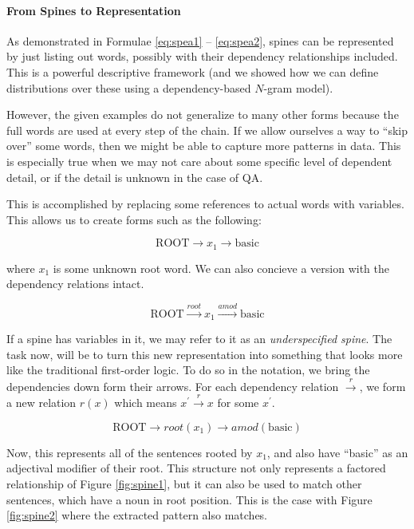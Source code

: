 \documentclass[twoside]{article}
\begin{document}
\paragraph{From Spines to Representation}

As demonstrated in Formulae \ref{eq:spea1} -- \ref{eq:spea2}, spines can be represented by just listing out words, possibly with their dependency relationships included.  This is a powerful descriptive framework (and we showed how we can define distributions over these using a dependency-based $N$-gram model).

However, the given examples do not generalize to many other forms because the full words are used at every step of the chain.  If we allow ourselves a way to ``skip over'' some words, then we might be able to capture more patterns in data.  This is especially true when we may not care about some specific level of dependent detail, or if the detail is unknown in the case of QA.

This is accomplished by replacing some references to actual words with variables.  This allows us to create forms such as the following:

\begin{equation} \label{eq:speq1}
\text{ROOT}\rightarrow x_1 \rightarrow \text{basic}
\end{equation}

where $x_1$ is some unknown root word.  We can also concieve a version with the dependency relations intact.

\begin{equation} \label{eq:speq2}
\text{ROOT} \overset{root}{\rightarrow} x_1 \overset{amod}{\rightarrow} \text{basic}
\end{equation}

If a spine has variables in it, we may refer to it as an \textit{underspecified spine}.  The task now, will be to turn this new representation into something that looks more like the traditional first-order logic.  To do so in the notation, we bring the dependencies down form their arrows.  For each dependency relation $\overset{r}{\rightarrow}$, we form a new relation $r(x)$ which means $x^\prime \overset{r}{\rightarrow} x$ for some $x^\prime$.

\begin{equation} \label{eq:speq3}
\text{ROOT}\rightarrow root(x_1) \rightarrow amod ( \text{basic} )
\end{equation}

Now, this represents all of the sentences rooted by $x_1$, and also have ``basic'' as an adjectival modifier of their root.  This structure not only represents a factored relationship of Figure \ref{fig:spine1}, but it can also be used to match other sentences, which have a noun in root position.  This is the case with Figure \ref{fig:spine2} where the extracted pattern also matches.
\end{document}
